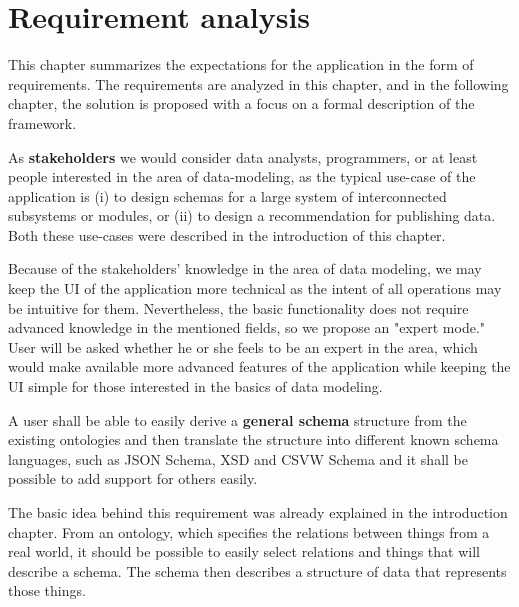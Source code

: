 \chapter{Requirement analysis}\label{chapters:analysis}

This chapter summarizes the expectations for the application in the form of requirements. The requirements are analyzed in this chapter, and in the following chapter, the solution is proposed with a focus on a formal description of the framework.

\bigskip

As \textbf{stakeholders} we would consider data analysts, programmers, or at least people interested in the area of data-modeling, as the typical use-case of the application is (i) to design schemas for a large system of interconnected subsystems or modules, or (ii) to design a recommendation for publishing data. Both these use-cases were described in the introduction of this chapter.

Because of the stakeholders' knowledge in the area of data modeling, we may keep the UI of the application more technical as the intent of all operations may be intuitive for them. Nevertheless, the basic functionality does not require advanced knowledge in the mentioned fields, so we propose an "expert mode." User will be asked whether he or she feels to be an expert in the area, which would make available more advanced features of the application while keeping the UI simple for those interested in the basics of data modeling.

\bigskip

\begin{requirement}
A user shall be able to easily derive a \textbf{general schema} structure from the existing ontologies and then translate the structure into different known schema languages, such as JSON Schema, XSD and CSVW Schema and it shall be possible to add support for others easily.
\label{requirement:general-schema}
\end{requirement}

The basic idea behind this requirement was already explained in the introduction chapter. From an ontology, which specifies the relations between things from a real world, it should be possible to easily select relations and things that will describe a schema. The schema then describes a structure of data that represents those things.

